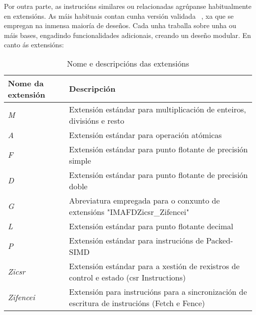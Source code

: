 Por outra parte, as instrucións similares ou relacionadas agrúpanse habitualmente en extensións. As máis habituais contan cunha versión validada ~\cite{ratified_extensions}, xa que se empregan na inmensa maioría de deseños. Cada unha traballa sobre unha ou máis bases, engadindo funcionalidades adicionais, creando un deseño modular. 
En canto ás extensións: 

\begin{table}[hp!]
  \centering
  \begin{tabular}{p{5cm}|p{7cm}}
    \rowcolor{udcpink!25}
    \textbf{Nome da extensión} & \textbf{Descripción} \\\hline
    \textit{M} & Extensión estándar para multiplicación de enteiros, divisións e resto \\
    \textit{A} & Extensión estándar para operación atómicas \\
    \textit{F} & Extensión estándar para punto flotante de precisión simple \\
    \textit{D} & Extensión estándar para punto flotante de precisión doble \\
    \textit{G} & Abreviatura empregada para o conxunto de extensións "IMAFDZicsr\_Zifencei" \\
    \textit{L} & Extensión estándar para punto flotante decimal \\
    \textit{P} & Extensión estándar para instrucións de Packed-SIMD \\
    \textit{Zicsr} & Extensión estándar para a xestión de rexistros de control e estado (\acrfull{csr} Instructions) \\
    \textit{Zifencei} &  Extensión para instrucións para a sincronización de escritura de instrucións (Fetch e Fence) \\
  \end{tabular}
  \caption{Nome e descripcións das extensións}
  \label{tab:extensiones}
\end{table}


